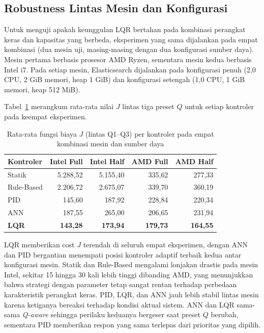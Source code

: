 \subsection{Robustness Lintas Mesin dan Konfigurasi}
\label{sec:robustness}

Untuk menguji apakah keunggulan LQR bertahan pada kombinasi perangkat keras dan kapasitas
yang berbeda, eksperimen yang sama dijalankan pada empat kombinasi (dua mesin uji, masing-masing
dengan dua konfigurasi sumber daya).
Mesin pertama berbasis prosesor AMD Ryzen, sementara mesin kedua berbasis Intel i7.
Pada setiap mesin, Elasticsearch dijalankan pada konfigurasi penuh (2{,}0 CPU, 2 GiB memori,
heap 1 GiB) dan konfigurasi setengah (1{,}0 CPU, 1 GiB memori, heap 512 MiB).

Tabel~\ref{tab:cross-experiment} merangkum rata-rata nilai $J$ lintas tiga preset $Q$
untuk setiap kontroler pada keempat eksperimen.

\begin{table}[H]
    \centering
    \caption{Rata-rata fungsi biaya $J$ (lintas Q1--Q3) per kontroler pada empat kombinasi mesin dan sumber daya}
    \label{tab:cross-experiment}
    \renewcommand{\arraystretch}{1.4}
    \begin{tabular}{|l|r|r|r|r|}
    \hline
    \textbf{Kontroler} & \textbf{Intel Full} & \textbf{Intel Half} & \textbf{AMD Full} & \textbf{AMD Half} \\
    \hline
    Statik        & 5.288{,}52 & 5.155{,}40 & 335{,}62 & 277{,}33 \\
    \hline
    Rule-Based    & 2.206{,}72 & 2.675{,}07 & 339{,}70 & 360{,}19 \\
    \hline
    PID           &    145{,}60 &   187{,}92 & 228{,}84 & 220{,}34 \\
    \hline
    ANN           &    187{,}55 &   265{,}00 & 206{,}65 & 231{,}94 \\
    \hline
    \textbf{LQR}  & \textbf{143{,}28} & \textbf{173{,}94} & \textbf{179{,}73} & \textbf{164{,}55} \\
    \hline
    \end{tabular}
\end{table}

LQR memberikan cost $J$ terendah di seluruh empat eksperimen, dengan ANN dan PID
bergantian menempati posisi kontroler adaptif terbaik kedua antar konfigurasi mesin. Statik dan Rule-Based mengalami lonjakan drastis pada
mesin Intel, sekitar 15 hingga 30 kali lebih tinggi dibanding AMD, yang menunjukkan
bahwa strategi dengan parameter tetap sangat rentan terhadap perbedaan karakteristik
perangkat keras.
PID, LQR, dan ANN jauh lebih stabil lintas mesin karena ketiganya bereaksi terhadap
kondisi aktual sistem. ANN dan LQR sama-sama \emph{Q-aware} sehingga perilaku keduanya
bergeser saat preset $Q$ berubah, sementara PID memberikan respon yang sama terlepas
dari prioritas yang dipilih.

